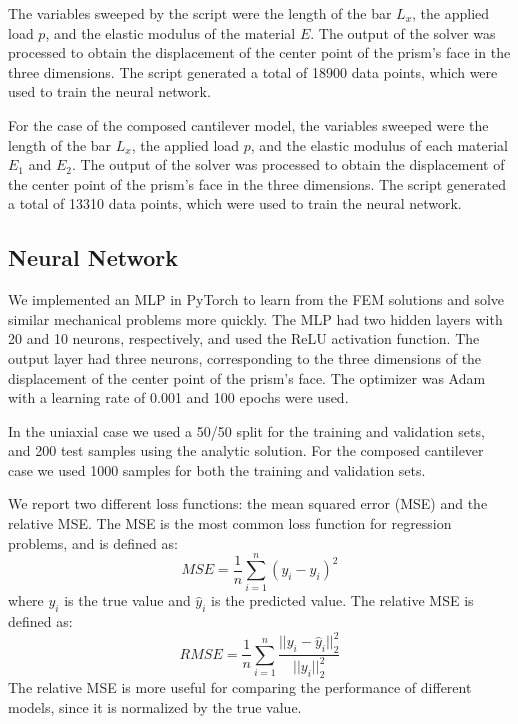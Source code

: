 \documentclass[11pt]{scrartcl} %
\begin{document}
The variables sweeped by the script were the length of the bar $L_x$, the applied load $p$, and the elastic modulus of the material $E$. The output of the solver was processed to obtain the displacement of the center point of the prism's face in the three dimensions.  The script generated a total of 18900 data points, which were used to train the neural network.

For the case of the composed cantilever model, the variables sweeped were the length of the bar $L_x$, the applied load $p$, and the elastic modulus of each material $E_1$ and $E_2$. The output of the solver was processed to obtain the displacement of the center point of the prism's face in the three dimensions. The script generated a total of 13310 data points, which were used to train the neural network.


\subsection{Neural Network}
We implemented an MLP in PyTorch to learn from the FEM solutions and solve similar mechanical problems more quickly. The MLP had two hidden layers with 20 and 10 neurons, respectively, and used the ReLU activation function. The output layer had three neurons, corresponding to the three dimensions of the displacement of the center point of the prism's face. The optimizer was Adam with a learning rate of 0.001 and 100 epochs were used. 

In the uniaxial case we used a 50/50 split for the training and validation sets, and 200 test samples using the analytic solution. For the composed cantilever case we used 1000 samples for both the training and validation sets.

We report two different loss functions: the mean squared error (MSE) and the relative MSE. The MSE is the most common loss function for regression problems, and is defined as:
\begin{equation}
\label{eq:MSE}
MSE = \frac{1}{n} \sum_{i=1}^{n} (y_i - \hat{y}_i)^2
\end{equation}
where $y_i$ is the true value and $\hat{y}_i$ is the predicted value. The relative MSE is defined as:
\begin{equation}
\label{eq:RMSE}
RMSE = \frac{1}{n} \sum_{i=1}^{n} \frac{||y_i - \hat{y}_i||_2^2}{||y_i||_2^2}
\end{equation}
The relative MSE is more useful for comparing the performance of different models, since it is normalized by the true value.
\end{document}
